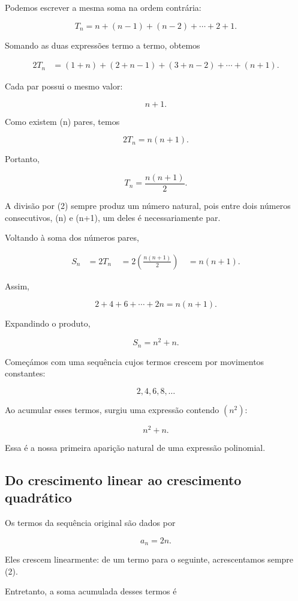 \documentclass[12pt,a4paper]{article}
\begin{document}
Podemos escrever a mesma soma na ordem contrária:

\[
T_n=n+(n-1)+(n-2)+\cdots+2+1.
\]

Somando as duas expressões termo a termo, obtemos

\[
\begin{aligned}
2T_n
&=(1+n)+(2+n-1)+(3+n-2)+\cdots+(n+1).
\end{aligned}
\]

Cada par possui o mesmo valor:

\[
n+1.
\]

Como existem (n) pares, temos

\[
2T_n=n(n+1).
\]

Portanto,

\[
T_n=\frac{n(n+1)}{2}.
\]

A divisão por (2) sempre produz um número natural, pois entre dois
números consecutivos, (n) e (n+1), um deles é necessariamente par.

Voltando à soma dos números pares,

\[
\begin{aligned}
S_n
&=2T_n\
&=2\left(\frac{n(n+1)}{2}\right)\
&=n(n+1).
\end{aligned}
\]

Assim,

\[
2+4+6+\cdots+2n=n(n+1).
\]

Expandindo o produto,

\[
S_n=n^2+n.
\]

Começámos com uma sequência cujos termos crescem por movimentos
constantes:

\[
2,4,6,8,\ldots
\]

Ao acumular esses termos, surgiu uma expressão contendo $(n^2)$:

\[
n^2+n.
\]

Essa é a nossa primeira aparição natural de uma expressão polinomial.

\subsection{Do crescimento linear ao crescimento quadrático}

Os termos da sequência original são dados por

\[
a_n=2n.
\]

Eles crescem linearmente: de um termo para o seguinte, acrescentamos
sempre (2).

Entretanto, a soma acumulada desses termos é
\end{document}
